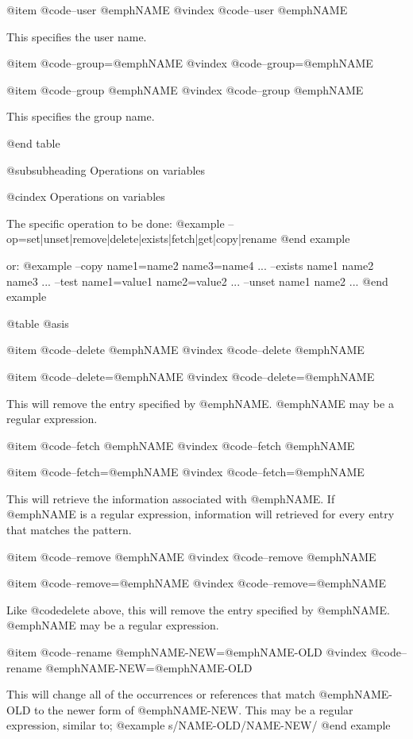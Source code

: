 @item @code{--user }@emph{NAME}
@vindex @code{--user }@emph{NAME}

This specifies the user name.

@item @code{--group=}@emph{NAME}
@vindex @code{--group=}@emph{NAME}

@item @code{--group }@emph{NAME}
@vindex @code{--group }@emph{NAME}

This specifies the group name.

@end table

@subsubheading Operations on variables

@cindex Operations on variables

The specific operation to be done:
@example
        --op=set|unset|remove|delete|exists|fetch|get|copy|rename
@end example

or:
@example
        --copy   name1=name2 name3=name4 ...
        --exists name1 name2 name3 ...
        --test   name1=value1 name2=value2 ...
        --unset  name1 name2 ...
@end example

@table @asis

@item @code{--delete }@emph{NAME}
@vindex @code{--delete }@emph{NAME}

@item @code{--delete=}@emph{NAME}
@vindex @code{--delete=}@emph{NAME}

This will remove the entry specified by @emph{NAME}.  @emph{NAME} may be a regular
expression.

@item @code{--fetch }@emph{NAME}
@vindex @code{--fetch }@emph{NAME}

@item @code{--fetch=}@emph{NAME}
@vindex @code{--fetch=}@emph{NAME}

This will retrieve the information associated with @emph{NAME}.  If @emph{NAME} is a
regular expression, information will retrieved for every entry that matches the
pattern.

@item @code{--remove }@emph{NAME}
@vindex @code{--remove }@emph{NAME}

@item @code{--remove=}@emph{NAME}
@vindex @code{--remove=}@emph{NAME}

Like @code{delete} above, this will remove the entry specified by @emph{NAME}.  @emph{NAME}
may be a regular expression.

@item @code{--rename} @emph{NAME-NEW}=@emph{NAME-OLD}
@vindex @code{--rename} @emph{NAME-NEW}=@emph{NAME-OLD}

This will change all of the occurrences or references that match @emph{NAME-OLD} to
the newer form of @emph{NAME-NEW}.  This may be a regular expression, similar to;
@example
        s/NAME-OLD/NAME-NEW/
@end example

